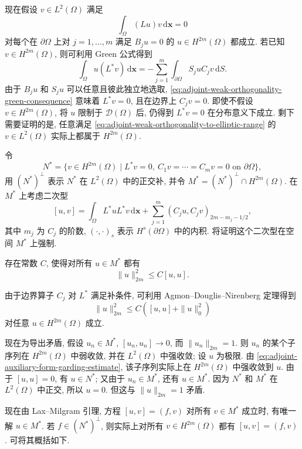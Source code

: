 现在假设 $v\in L^2(\Omega)$ 满足
\begin{equation}\label{eq:adjoint-weak-orthogonality-to-elliptic-range}
\int_\Omega(Lu)v\,\mathrm{d}\bm{x}=0
\end{equation}
对每个在 $\partial\Omega$ 上对 $j=1,\ldots,m$ 满足 $B_ju=0$ 的 $u\in H^{2m}(\Omega)$ 都成立. 若已知 $v\in H^{2m}(\Omega)$, 则可利用 Green 公式得到
\begin{equation}\label{eq:adjoint-weak-orthogonality-green-consequence}
\int_\Omega u(L^*v)\,\mathrm{d}\bm{x}=-\sum_{j=1}^m\int_{\partial\Omega}S_juC_jv\,\mathrm{d}S.
\end{equation}
由于 $B_ju$ 和 $S_ju$ 可以任意且彼此独立地选取, \eqref{eq:adjoint-weak-orthogonality-green-consequence} 意味着 $L^*v=0$, 且在边界上 $C_jv=0$. 即使不假设 $v\in H^{2m}(\Omega)$, 将 $u$ 限制于 $\mathcal{D}(\Omega)$ 后, 仍得到 $L^*v=0$ 在分布意义下成立. 剩下需要证明的是, 任意满足 \eqref{eq:adjoint-weak-orthogonality-to-elliptic-range} 的 $v\in L^2(\Omega)$ 实际上都属于 $H^{2m}(\Omega)$.

令
\begin{equation}\label{eq:adjoint-homogeneous-boundary-nullspace}
N^*=\{v\in H^{2m}(\Omega)\mid L^*v=0,\ C_1v=\cdots=C_mv=0\text{ on }\partial\Omega\},
\end{equation}
用 $(N^*)^\perp$ 表示 $N^*$ 在 $L^2(\Omega)$ 中的正交补, 并令 $M^*=(N^*)^\perp\cap H^{2m}(\Omega)$. 在 $M^*$ 上考虑二次型
\begin{equation}\label{eq:adjoint-auxiliary-quadratic-form}
[u,v]=\int_\Omega L^*uL^*v\,\mathrm{d}\bm{x}+\sum_{j=1}^m(C_ju,C_jv)_{2m-m_j-1/2},
\end{equation}
其中 $m_j$ 为 $C_j$ 的阶数, $(\cdot,\cdot)_s$ 表示 $H^s(\partial\Omega)$ 中的内积. 将证明这个二次型在空间 $M^*$ 上强制.

\begin{Lemma}
\label{lem:adjoint-auxiliary-form-complement-coercivity}
存在常数 $C$, 使得对所有 $u\in M^*$ 都有
\begin{equation}\label{eq:adjoint-auxiliary-form-complement-coercivity}
\|u\|_{2m}^2\leq C[u,u].
\end{equation}

\end{Lemma}

\begin{Proof}
由于边界算子 $C_j$ 对 $L^*$ 满足补条件, 可利用 Agmon--Douglis--Nirenberg 定理得到
\begin{equation}\label{eq:adjoint-auxiliary-form-garding-estimate}
\|u\|_{2m}^2\leq C([u,u]+\|u\|_0^2)
\end{equation}
对任意 $u\in H^{2m}(\Omega)$ 成立.

现在为导出矛盾, 假设 $u_n\in M^*$, $[u_n,u_n]\to0$, 而 $\|u_n\|_{2m}=1$. 则 $u_n$ 的某个子序列在 $H^{2m}(\Omega)$ 中弱收敛, 并在 $L^2(\Omega)$ 中强收敛; 设 $u$ 为极限. 由 \eqref{eq:adjoint-auxiliary-form-garding-estimate}, 该子序列实际上在 $H^{2m}(\Omega)$ 中强收敛到 $u$. 由于 $[u,u]=0$, 有 $u\in N^*$; 又由于 $u_n\in M^*$, 还有 $u\in M^*$. 因为 $N^*$ 和 $M^*$ 在 $L^2(\Omega)$ 中正交, 所以 $u=0$. 但这与 $\|u\|_{2m}=1$ 矛盾.
\end{Proof}

现在由 Lax--Milgram 引理, 方程 $[u,v]=(f,v)$ 对所有 $v\in M^*$ 成立时, 有唯一解 $u\in M^*$. 若 $f\in(N^*)^\perp$, 则实际上对所有 $v\in H^{2m}(\Omega)$ 都有 $[u,v]=(f,v)$. 可将其概括如下.
